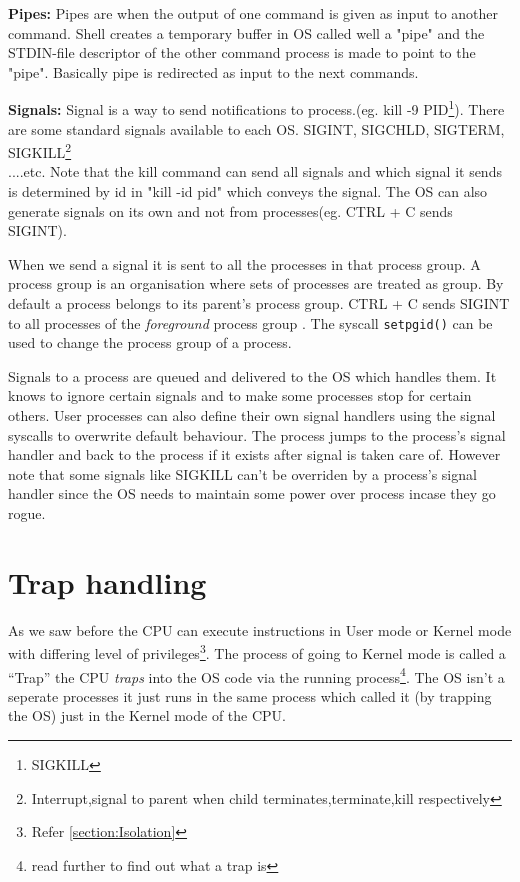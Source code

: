 \documentclass[12pt]{article}
\newcommand{\tbox}[1]{\noindent\fbox{\parbox{\textwidth}{#1}}}
\begin{document}
\textbf{Pipes:}
Pipes are when the output of one command is given as input to another command.
Shell creates a temporary buffer in OS called well a "pipe" and the STDIN-file descriptor of the other command process is made to point to the 
"pipe". Basically pipe is redirected as input to the next commands.


\textbf{Signals:}
Signal is a way to send notifications to process.(eg. kill -9 PID\footnote{SIGKILL}). There are some standard signals available to each OS. SIGINT, SIGCHLD, SIGTERM, SIGKILL\footnote{Interrupt,signal to parent when child terminates,terminate,kill respectively}\\....etc.
Note that the kill command can send all signals and which signal it sends is determined by id in "kill -id pid" which conveys the signal. The OS can also
generate signals on its own and not from processes(eg. CTRL + C sends SIGINT).


When we send a signal it is sent to all the processes in that process group. A process group is an organisation where sets of processes
are treated as group. By default a process belongs to its parent's process group. CTRL + C sends SIGINT to all processes of the \textit{foreground} process group
. The syscall \texttt{setpgid()} can be used to change the process group of a process.


Signals to a process are queued and delivered to the OS which handles them. It knows to ignore certain signals and to 
make some processes stop for certain others. User processes can also define their own signal handlers using the signal syscalls to overwrite default behaviour.
 The process jumps to the process's signal handler and back to the process if it exists after signal is taken care of.
However note that some signals like SIGKILL can't be overriden by a process's signal handler since the OS needs to maintain some power over process incase they go rogue.
\\
\newpage
\noindent\tbox{
    \begin{center}
    \textbf{\Huge Lecture 6}
    \end{center}
}

\section{Trap handling}
\label{section:trap}
As we saw before the CPU can execute instructions in User mode or Kernel mode with differing level of privileges\footnote{Refer \ref{section:Isolation}}.
The process of going to Kernel mode is called a ``Trap'' the CPU \textit{traps} into the OS code via the running process\footnote{read further to find out what a trap is}.
The OS isn't a seperate processes it just runs in the same process which called it (by trapping the OS) just in the Kernel mode of the CPU.
\end{document}
